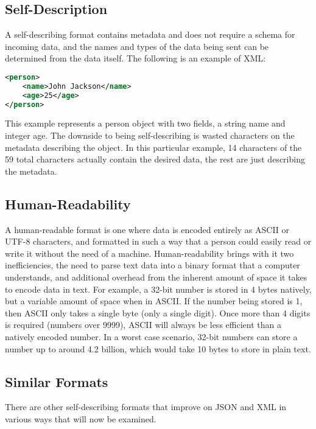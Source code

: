 \documentclass[conference]{IEEEtran}
\begin{document}
\subsection{Self-Description}

A self-describing format contains metadata and does not require a schema for incoming data, and the names and types of the data being sent can be determined from the data itself. The following is an example of XML:

\begin{lstlisting}[language=XML]
<person>
	<name>John Jackson</name>
	<age>25</age>
</person>
\end{lstlisting}

This example represents a person object with two fields, a string name and integer age. The downside to being self-describing is wasted characters on the metadata describing the object. In this particular example, 14 characters of the 59 total characters actually contain the desired data, the rest are just describing the metadata.

\subsection{Human-Readability}

A human-readable format is one where data is encoded entirely as ASCII or UTF-8 characters, and formatted in such a way that a person could easily read or write it without the need of a machine. Human-readability brings with it two inefficiencies, the need to parse text data into a binary format that a computer understands, and additional overhead from the inherent amount of space it takes to encode data in text. For example, a 32-bit number is stored in 4 bytes natively, but a variable amount of space when in ASCII. If the number being stored is 1, then ASCII only takes a single byte (only a single digit). Once more than 4 digits is required (numbers over 9999), ASCII will always be less efficient than a natively encoded number. In a worst case scenario, 32-bit numbers can store a number up to around 4.2 billion, which would take 10 bytes to store in plain text.

\subsection{Similar Formats}

There are other self-describing formats that improve on JSON and XML in various ways that will now be examined.
\end{document}
